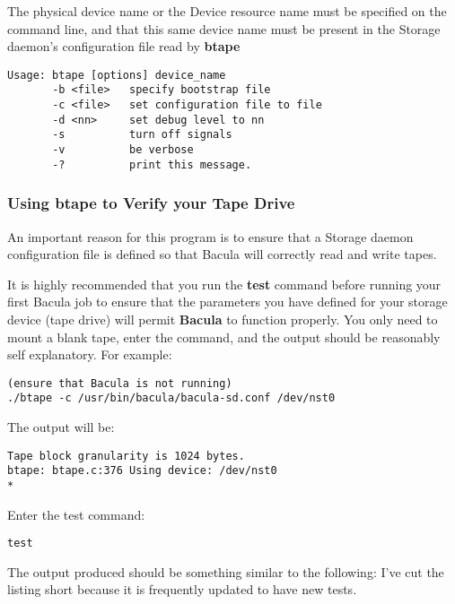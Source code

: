 The physical device name or the Device resource name must be specified on the
command line, and that this same device name must be present in the Storage
daemon's configuration file read by {\bf btape} 

\footnotesize
\begin{verbatim}
Usage: btape [options] device_name
       -b <file>   specify bootstrap file
       -c <file>   set configuration file to file
       -d <nn>     set debug level to nn
       -s          turn off signals
       -v          be verbose
       -?          print this message.
\end{verbatim}
\normalsize

\subsubsection*{Using btape to Verify your Tape Drive}

An important reason for this program is to ensure that a Storage daemon
configuration file is defined so that Bacula will correctly read and write
tapes. 

It is highly recommended that you run the {\bf test} command before running
your first Bacula job to ensure that the parameters you have defined for your
storage device (tape drive) will permit {\bf Bacula} to function properly. You
only need to mount a blank tape, enter the command, and the output should be
reasonably self explanatory. For example: 

\footnotesize
\begin{verbatim}
(ensure that Bacula is not running)
./btape -c /usr/bin/bacula/bacula-sd.conf /dev/nst0
\end{verbatim}
\normalsize

The output will be: 

\footnotesize
\begin{verbatim}
Tape block granularity is 1024 bytes.
btape: btape.c:376 Using device: /dev/nst0
*
\end{verbatim}
\normalsize

Enter the test command: 

\footnotesize
\begin{verbatim}
test
\end{verbatim}
\normalsize

The output produced should be something similar to the following: I've cut the
listing short because it is frequently updated to have new tests. 

